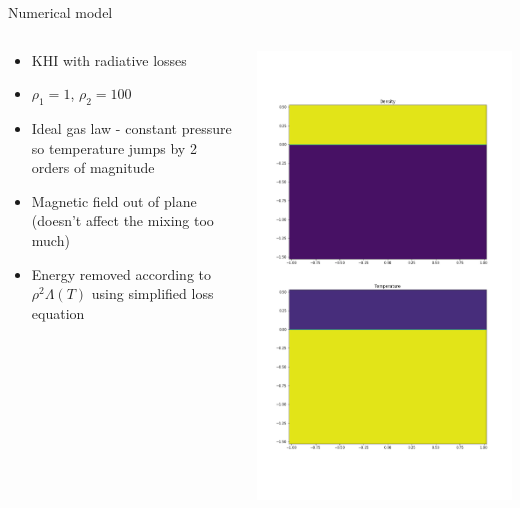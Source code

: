 \documentclass[10pt,aspectratio=169,usenames,dvipsnames]{beamer}
\begin{document}


\begin{frame}{Numerical model}
\begin{columns}
\begin{column}{0.65\textwidth}
\begin{itemize}
    \item KHI with radiative losses
    \item $\rho_1 =1$, $\rho_2 =100$
    \item Ideal gas law - constant pressure so temperature jumps by 2 orders of magnitude
    \item Magnetic field out of plane (doesn't affect the mixing too much)
    \item Energy removed according to $\rho^2 \Lambda (T)$ using simplified loss equation
\end{itemize}
\end{column}
\begin{column}{0.35\textwidth}
\includegraphics[width=0.95\linewidth]{2023Dundee/Figures/ic.png}
\end{column}
\end{columns}
\end{frame}
\end{document}
